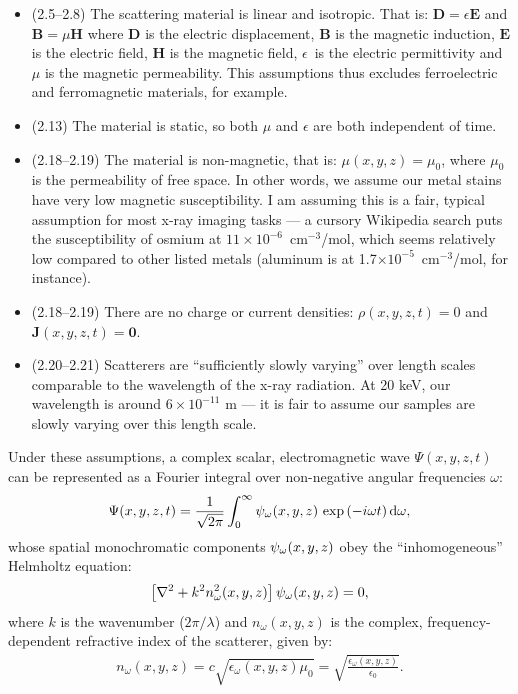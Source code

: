 \documentclass{article}
\begin{document}
\begin{itemize}
\item (2.5--2.8) The scattering material is linear and isotropic. That is:
  $\bm{D} = \epsilon\bm{E}$ and $\bm{B} = \mu\bm{H}$ where $\bm{D}$ is the
  electric displacement, $\bm{B}$ is the magnetic induction, $\bm{E}$ is the
  electric field, $\bm{H}$ is the magnetic field, $\epsilon$~is the electric
  permittivity and $\mu$ is the magnetic permeability. This assumptions thus
  excludes ferroelectric and ferromagnetic materials, for example.

\item (2.13) The material is static, so both $\mu$ and $\epsilon$ are both
  independent of time.

\item (2.18--2.19) The material is non-magnetic, that is: $\mu(x,y,z) = \mu_0$,
  where $\mu_0$ is the permeability of free space. In other words, we assume our
  metal stains have very low magnetic susceptibility. I am assuming this is a
  fair, typical assumption for most x-ray imaging tasks --- a cursory Wikipedia
  search puts the susceptibility of osmium at $11 \times 10^{-6}$~cm$^{-3}$/mol,
  which seems relatively low compared to other listed metals (aluminum is at
  1.7$\times 10^{-5}$~cm$^{-3}$/mol, for instance).

\item (2.18--2.19) There are no charge or current densities: $\rho(x,y,z,t) = 0$
  and $\bm{J}(x,y,z,t) = \bm{0}$.

\item (2.20--2.21) Scatterers are ``sufficiently slowly varying'' over length
  scales comparable to the wavelength of the x-ray radiation. At 20 keV, our
  wavelength is around $6\times 10^{-11}$ m --- it is fair to assume our samples
  are slowly varying over this length scale.
\end{itemize}

Under these assumptions, a complex scalar, electromagnetic wave $\Psi(x,y,z,t)$ can
be represented as a Fourier integral over non-negative angular frequencies $\omega$:
\begin{align}
  \Psi(x,y,z,t) = \frac{1}{\sqrt{2\pi}}\int_0^{\infty} \psi_{\omega}(x,y,z)\text{ exp}\left(-i\omega t\right)\mathrm{d}\omega,
  \label{eq:polychromatic}
\end{align}
whose spatial monochromatic components $\psi_{\omega}(x,y,z)$ obey the
``inhomogeneous'' Helmholtz equation:
\begin{align}
  \label{eq:helm}
  \left[\nabla^2 + k^2 n_{\omega}^2(x,y,z)\right]\psi_{\omega}(x,y,z) = 0,
\end{align}
where $k$ is the wavenumber ($2\pi/\lambda$) and $n_{\omega}(x,y,z)$ is the
complex, frequency-dependent refractive index of the scatterer, given by:
\begin{align}
  n_{\omega}(x,y,z) = c\sqrt{\epsilon_{\omega}(x,y,z)\mu_0} = \sqrt{\frac{\epsilon_{\omega}(x,y,z)}{\epsilon_0}}.
\end{align}
\end{document}

